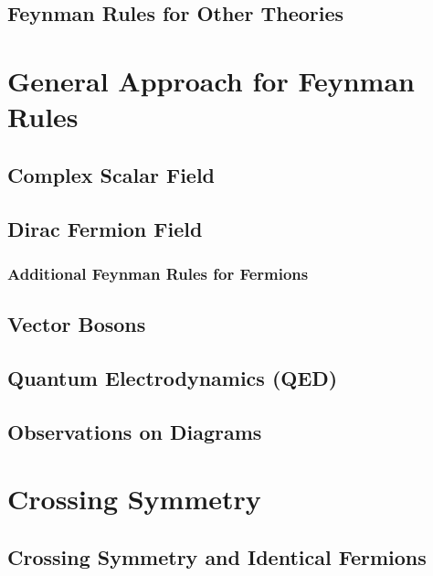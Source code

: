 \subsection{Feynman Rules for Other Theories}



\section{General Approach for Feynman Rules}


\subsection{Complex Scalar Field}


\subsection{Dirac Fermion Field}

\subsubsection{Additional Feynman Rules for Fermions}

\begin{example}

\end{example}

\begin{example}

\end{example}

\subsection{Vector Bosons}

\subsection{Quantum Electrodynamics (QED)}

\begin{example}

\end{example}

\subsection{Observations on Diagrams}

\section{Crossing Symmetry}

\subsection{Crossing Symmetry and Identical Fermions}


